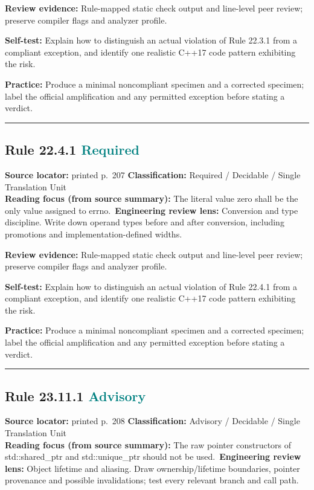 \documentclass[10pt,letterpaper]{article}
\begin{document}
\textbf{Review evidence:} Rule-mapped static check output and line-level peer review; preserve compiler flags and analyzer profile.

\textbf{Self-test:} Explain how to distinguish an actual violation of Rule 22.3.1 from a compliant exception, and identify one realistic C++17 code pattern exhibiting the risk.\par
\textbf{Practice:} Produce a minimal noncompliant specimen and a corrected specimen; label the official amplification and any permitted exception before stating a verdict.
\smallskip\hrule\smallskip
\subsection*{Rule 22.4.1 \enspace \texorpdfstring{\small\textcolor{teal}{Required}}{Required}}
\noindent\textbf{Source locator:} printed p.~207 \quad\textbf{Classification:} Required / Decidable / Single Translation Unit\\
\textbf{Reading focus (from source summary):} The literal value zero shall be the only value assigned to errno.\
\textbf{Engineering review lens:} Conversion and type discipline. Write down operand types before and after conversion, including promotions and implementation-defined widths.

\textbf{Review evidence:} Rule-mapped static check output and line-level peer review; preserve compiler flags and analyzer profile.

\textbf{Self-test:} Explain how to distinguish an actual violation of Rule 22.4.1 from a compliant exception, and identify one realistic C++17 code pattern exhibiting the risk.\par
\textbf{Practice:} Produce a minimal noncompliant specimen and a corrected specimen; label the official amplification and any permitted exception before stating a verdict.
\smallskip\hrule\smallskip
\subsection*{Rule 23.11.1 \enspace \texorpdfstring{\small\textcolor{teal}{Advisory}}{Advisory}}
\noindent\textbf{Source locator:} printed p.~208 \quad\textbf{Classification:} Advisory / Decidable / Single Translation Unit\\
\textbf{Reading focus (from source summary):} The raw pointer constructors of std::shared\_ptr and std::unique\_ptr should not be used.\
\textbf{Engineering review lens:} Object lifetime and aliasing. Draw ownership/lifetime boundaries, pointer provenance and possible invalidations; test every relevant branch and call path.
\end{document}
